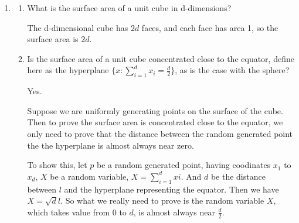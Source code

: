 \documentclass[a4paper, 12pt]{mcshw}
\begin{document}
\begin{enumerate}
    \item 
        \begin{enumerate}
            \item 
                What is the surface area of a unit cube in d-dimensions?
                \begin{solution}
                    The d-dimensional cube has $2d$ faces, and each face has area 1, so the surface area is $2d$.
                \end{solution}
            \item
                Is the surface area of a unit cube concentrated close to the equator, define here as the hyperplane $\{x: \sum\limits_{i = 1}^{d}x_i = \frac{d}{2}\}$, as is the case with the sphere?
                \begin{solution}
                    Yes.

                    Suppose we are uniformly generating points on the surface of the cube. Then to prove the surface area is concentrated close to the equator, we only need to prove that the distance between the random generated point the the hyperplane is almost always near zero. 
                    
                    To show this, let $p$ be a random generated point, having coodinates $x_1$ to $x_d$, $X$ be a random variable, $X = \sum_{i = 1}^{d}xi$. And $d$ be the distance between $l$ and the hyperplane representing the equator. Then we have $X = \sqrt{d}l$. So what we really need to prove is the random variable $X$, which takes value from $0$ to $d$, is almost always near $\frac{d}{2}$.


\end{solution}
\end{enumerate}
\end{enumerate}
\end{document}
